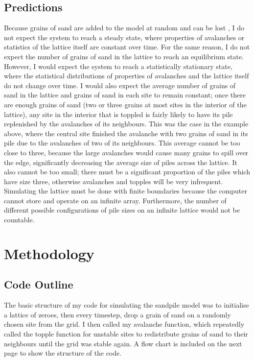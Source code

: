 \documentclass{article}
\begin{document}
 \subsection{Predictions}
Because grains of sand are added to the model at random and can be lost , I do not expect the system to reach a steady state, where properties of avalanches or statistics of the lattice itself are constant over time. For the same reason, I do not expect the number of grains of sand in the lattice to reach an equilibrium state. However, I would expect the system to reach a statistically stationary state, where the statistical distributions of properties of avalanches and the lattice itself do not change over time. I would also expect the average number of grains of sand in the lattice and grains of sand in each site to remain constant; once there are enough grains of sand (two or three grains at most sites in the interior of the lattice), any site in the interior that is toppled is fairly likely to have its pile replenished by the avalanches of its neighbours. This was the case in the example above, where the central site finished the avalanche with two grains of sand in its pile due to the avalanches of two of its neighbours. This average cannot be too close to three, because the large avalanches would cause many grains to spill over the edge, significantly decreasing the average size of piles across the lattice. It also cannot be too small; there must be a significant proportion of the piles which have size three, otherwise avalanches and topples will be very infrequent. Simulating the lattice must be done with finite boundaries because the computer cannot store and operate on an infinite array. Furthermore, the number of different possible configurations of pile sizes on an infinite lattice would not be countable.
\newpage
\section{Methodology}
\subsection{Code Outline}
The basic structure of my code for simulating the sandpile model was to initialise a lattice of zeroes, then every timestep, drop a grain of sand on a randomly chosen site from the grid. I then called my avalanche function, which repeatedly called the topple function for unstable sites to redistribute grains of sand to their neighbours until the grid was stable again. A flow chart is included on the next page to show the structure of the code. 
\end{document}

